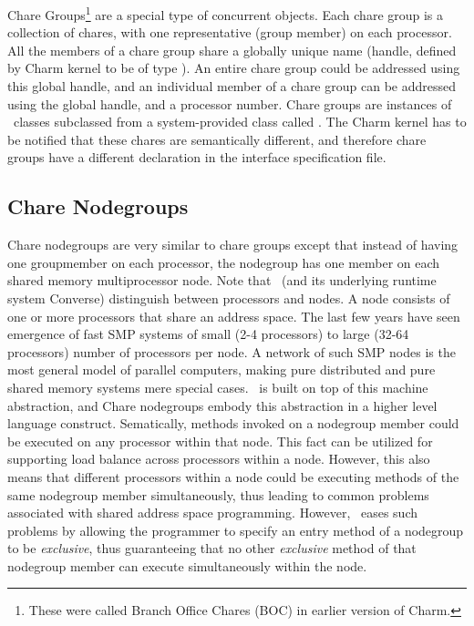 Chare Groups\footnote{ These were called Branch Office Chares (BOC) in earlier
version of Charm.  } are a special type of concurrent objects.  Each chare
group is a collection of chares, with one representative (group member) on each
processor. All the members of a chare group share a globally unique name
(handle, defined by Charm kernel to be of type ). An entire
chare group could be addressed using this global handle, and an individual
member of a chare group can be addressed using the global handle, and a
processor number. Chare groups are instances of \CC\ classes subclassed from a
system-provided class called . The Charm kernel has to be notified
that these chares are semantically different, and therefore chare groups have a
different declaration in the interface specification file.

\subsection{Chare Nodegroups}

Chare nodegroups are very similar to chare groups except that instead of having
one groupmember on each processor, the nodegroup has one member on each shared
memory multiprocessor node. Note that \charmpp\ (and its underlying runtime
system Converse) distinguish between processors and nodes. A node consists of
one or more processors that share an address space. The last few years have
seen emergence of fast SMP systems of small (2-4 processors) to large (32-64
processors) number of processors per node. A network of such SMP nodes is the
most general model of parallel computers, making pure distributed and pure
shared memory systems mere special cases. \charmpp\ is built on top of this
machine abstraction, and Chare nodegroups embody this abstraction in a higher
level language construct. Sematically, methods invoked on a nodegroup member
could be executed on any processor within that node. This fact can be utilized
for supporting load balance across processors within a node. However, this also
means that different processors within a node could be executing methods of the
same nodegroup member simultaneously, thus leading to common problems
associated with shared address space programming. However, \charmpp\ eases such
problems by allowing the programmer to specify an entry method of a nodegroup
to be {\em exclusive}, thus guaranteeing that no other {\em exclusive} method
of that nodegroup member can execute simultaneously within the node.

